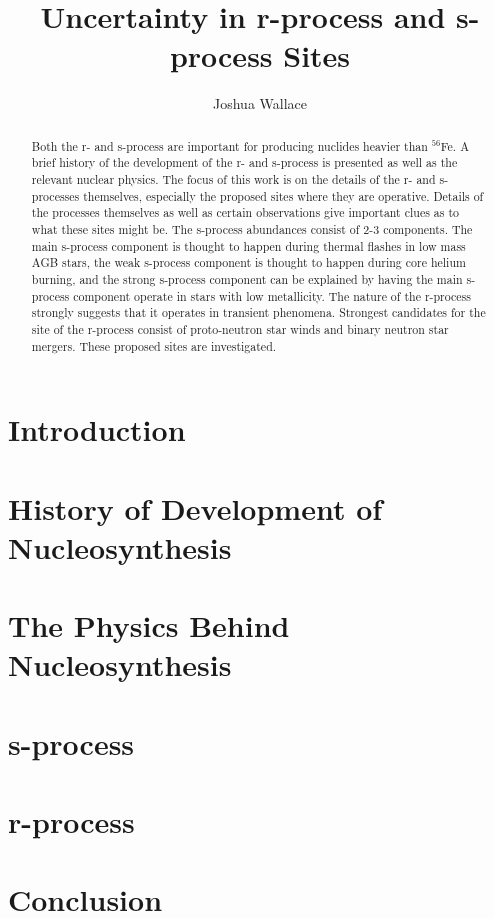 \documentclass{emulateapj}
\begin{document}
\title{Uncertainty in r-process and s-process Sites}

\author{Joshua Wallace}

\begin{abstract}
Both the r- and s-process are important for
producing nuclides heavier than $^{56}$Fe.  A brief history of the
development of the r- and s-process is presented as well as the
relevant nuclear physics.  The focus of this work
is on the details of the r- and s-processes themselves, especially the
proposed sites where they are operative. Details of the processes
themselves as well as certain observations give important clues as to
what these sites might be.
  The s-process abundances consist of
2-3 components.  The main s-process
component is thought to happen during thermal flashes in low mass AGB
stars, the weak s-process component is thought to happen during core
helium burning, and the strong s-process component can be explained by
having the main s-process component operate in stars with low
metallicity.  The nature of the r-process strongly suggests that it
operates in transient phenomena.  Strongest candidates for the site of the r-process consist of proto-neutron star
winds and binary neutron star mergers.  These proposed sites are
investigated.
\end{abstract}



\section{Introduction}


\section{History of Development of Nucleosynthesis}


\section{The Physics Behind Nucleosynthesis}


\section{s-process}



\section{r-process}



\section{Conclusion}




\end{document}
